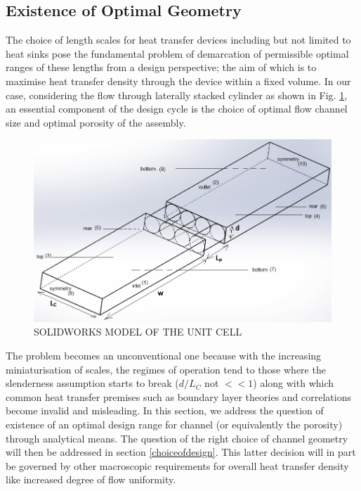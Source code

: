 \documentclass[twocolumn,10pt,cleanfoot]{ihmtc}
\begin{document}
\subsection{Existence of Optimal Geometry}\label{existence_dopt}
The choice of length scales for heat transfer devices including but not limited to heat sinks pose the fundamental problem of demarcation of permissible optimal ranges of these lengths from a design perspective; the aim of which is to maximise heat transfer density through the device within a fixed volume. In our case, considering the flow through laterally stacked cylinder as shown in Fig. \ref{simunitcell}, an essential component of the design cycle is the choice of  optimal flow channel size and optimal porosity of the assembly.
%
\begin{figure}[ht]
\centerline{\includegraphics[height=0.65\linewidth,width=1\linewidth]{simunitcell.png}}
\vspace{-1ex}
\caption{\small{SOLIDWORKS MODEL OF THE UNIT CELL}}
\vspace{-1.5em}
\label{simunitcell}
\end{figure}
%
The problem becomes an unconventional one because with the increasing miniaturisation of scales, the regimes of operation tend to those where the slenderness assumption starts to break ($d/L_C$ not $<< 1$) along with which common heat transfer premises such as boundary layer theories and correlations become invalid and misleading. In this section, we address the question of existence of an optimal design range for channel (or equivalently the porosity) through analytical means. The question of the right choice of channel geometry will then be addressed in section \ref{choiceofdesign}. This latter decision will in part be governed by other macroscopic requirements for
overall heat transfer density like increased degree of flow uniformity.
%
\end{document}
